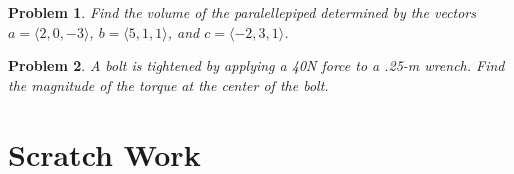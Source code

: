 \documentclass[11pt]{article}
\newtheorem{problem}{Problem}
\begin{document}
\vspace{5cm}

\begin{problem}
    Find the volume of the paralellepiped determined by the vectors $a= \langle 2,0,-3 \rangle$, $b=\langle 5,1,1 \rangle$, and $c=\langle -2,3,1 \rangle$.
\end{problem}


\vspace{8 cm}

\begin{problem}
    A bolt is tightened by applying a 40N force to a .25-m wrench. Find the magnitude of the torque at the center of the bolt.
\end{problem}

\newpage

\section{Scratch Work}
\end{document}
